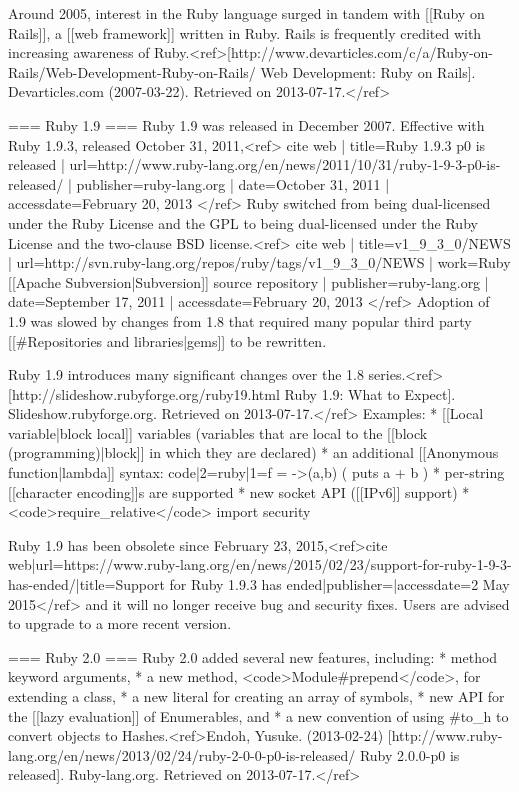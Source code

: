 Around 2005, interest in the Ruby language surged in tandem with [[Ruby on Rails]], a [[web framework]] written in Ruby. Rails is frequently credited with increasing awareness of Ruby.<ref>[http://www.devarticles.com/c/a/Ruby-on-Rails/Web-Development-Ruby-on-Rails/ Web Development: Ruby on Rails]. Devarticles.com (2007-03-22). Retrieved on 2013-07-17.</ref>

=== Ruby 1.9 ===
Ruby 1.9 was released in December 2007. Effective with Ruby 1.9.3, released October 31, 2011,<ref>
{{cite web
 | title=Ruby 1.9.3 p0 is released
 | url=http://www.ruby-lang.org/en/news/2011/10/31/ruby-1-9-3-p0-is-released/
 | publisher=ruby-lang.org
 | date=October 31, 2011
 | accessdate=February 20, 2013}}
</ref> Ruby switched from being dual-licensed under the Ruby License and the GPL to being dual-licensed under the Ruby License and the two-clause BSD license.<ref>
{{cite web
 | title=v1_9_3_0/NEWS
 | url=http://svn.ruby-lang.org/repos/ruby/tags/v1_9_3_0/NEWS
 | work=Ruby [[Apache Subversion|Subversion]] source repository
 | publisher=ruby-lang.org
 | date=September 17, 2011
 | accessdate=February 20, 2013}}
</ref> Adoption of 1.9 was slowed by changes from 1.8 that required many popular third party [[#Repositories and libraries|gems]] to be rewritten.

Ruby 1.9 introduces many significant changes over the 1.8 series.<ref>[http://slideshow.rubyforge.org/ruby19.html Ruby 1.9: What to Expect]. Slideshow.rubyforge.org. Retrieved on 2013-07-17.</ref>  Examples:
* [[Local variable|block local]] variables (variables that are local to the [[block (programming)|block]] in which they are declared)
* an additional [[Anonymous function|lambda]] syntax: {{code|2=ruby|1=f = ->(a,b) {{(}} puts a + b {{)}}}}
* per-string [[character encoding]]s are supported
* new socket API ([[IPv6]] support)
* <code>require_relative</code> import security

Ruby 1.9 has been obsolete since February 23, 2015,<ref>{{cite web|url=https://www.ruby-lang.org/en/news/2015/02/23/support-for-ruby-1-9-3-has-ended/|title=Support for Ruby 1.9.3 has ended|publisher=|accessdate=2 May 2015}}</ref> and it will no longer receive bug and security fixes. Users are advised to upgrade to a more recent version.

=== Ruby 2.0 ===
Ruby 2.0 added several new features, including:
* method keyword arguments,
* a new method, <code>Module#prepend</code>, for extending a class,
* a new literal for creating an array of symbols,
* new API for the [[lazy evaluation]] of Enumerables, and
* a new convention of using #to_h to convert objects to Hashes.<ref>Endoh, Yusuke. (2013-02-24) [http://www.ruby-lang.org/en/news/2013/02/24/ruby-2-0-0-p0-is-released/ Ruby 2.0.0-p0 is released]. Ruby-lang.org. Retrieved on 2013-07-17.</ref>

